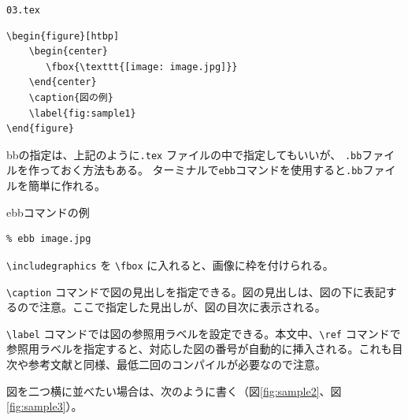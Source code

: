 \begin{itembox}[l]{{\tt 03.tex}}
\begin{verbatim}
\begin{figure}[htbp]
    \begin{center}
       \fbox{\texttt{[image: image.jpg]}}
    \end{center}
    \caption{図の例}
    \label{fig:sample1}
\end{figure}
\end{verbatim}
\end{itembox}

bbの指定は、上記のように{\tt *.tex} ファイルの中で指定してもいいが、
{\tt *.bb}ファイルを作っておく方法もある。
ターミナルで{\tt ebb}コマンドを使用すると{\tt *.bb}ファイルを簡単に作れる。


\begin{itembox}[l]{ebbコマンドの例}
\begin{verbatim}
% ebb image.jpg
\end{verbatim}
\end{itembox}


\verb|\includegraphics| を \verb|\fbox| に入れると、画像に枠を付けられる。

\verb|\caption| コマンドで図の見出しを指定できる。図の見出しは、図の下に表記するので注意。ここで指定した見出しが、図の目次に表示される。

\verb|\label| コマンドでは図の参照用ラベルを設定できる。本文中、\verb|\ref| コマンドで参照用ラベルを指定すると、対応した図の番号が自動的に挿入される。これも目次や参考文献と同様、最低二回のコンパイルが必要なので注意。

図を二つ横に並べたい場合は、次のように書く（図\ref{fig:sample2}、図\ref{fig:sample3}）。


